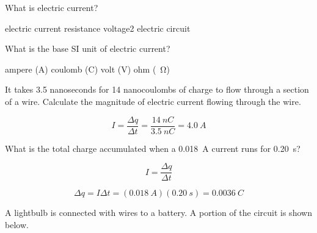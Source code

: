 \documentclass[answers]{exam}
\begin{document}
\begin{questions}

\question
What is electric current?

\begin{randomizechoices}
    \correctchoice \glsdesc{electric current}
    \choice \glsdesc{resistance}
    \choice \glsdesc{voltage2}
    \choice \glsdesc{electric circuit}
\end{randomizechoices}

\question
What is the base SI unit of electric current?

\begin{randomizechoices}
    \correctchoice ampere (A)
    \choice coulomb (C)
    \choice volt (V)
    \choice ohm (\SI{}{\ohm})
\end{randomizechoices}

\question
It takes 3.5 nanoseconds for 14 nanocoulombs of charge to flow through a section of a wire. Calculate the magnitude of electric current flowing through the wire.

\begin{solution}
\begin{equation*}
    I = \frac{\Delta q}{\Delta t} = \frac{\SI{14}{nC}}{\SI{3.5}{nC}} = \boxed{\SI{4.0}{A}}
\end{equation*}
\end{solution}


\question
What is the total charge accumulated when a \SI{0.018}{A} current runs for \SI{0.20}{s}?

\begin{solution}
\begin{equation*}
    I = \frac{\Delta q}{\Delta t}
\end{equation*}

\begin{equation*}
    \Delta q = I \Delta t = (\SI{0.018}{A})(\SI{0.20}{s}) = \boxed{\SI{0.0036}{C}}
\end{equation*}
\end{solution}


\question
A lightbulb is connected with wires to a battery. A portion of the circuit is shown below.


\begin{center}
\end{center}

\begin{parts}

\end{parts}
\end{questions}
\end{document}
